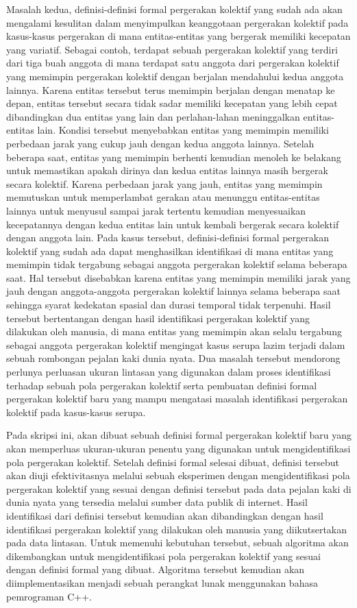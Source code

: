 Masalah kedua, definisi-definisi formal pergerakan kolektif yang sudah ada akan mengalami kesulitan dalam menyimpulkan keanggotaan pergerakan kolektif pada kasus-kasus pergerakan di mana entitas-entitas yang bergerak memiliki kecepatan yang variatif. Sebagai contoh, terdapat sebuah pergerakan kolektif yang terdiri dari tiga buah anggota di mana terdapat satu anggota dari pergerakan kolektif yang memimpin pergerakan kolektif dengan berjalan mendahului kedua anggota lainnya. Karena entitas tersebut terus memimpin berjalan dengan menatap ke depan, entitas tersebut secara tidak sadar memiliki kecepatan yang lebih cepat dibandingkan dua entitas yang lain dan perlahan-lahan meninggalkan entitas-entitas lain. Kondisi tersebut menyebabkan entitas yang memimpin memiliki perbedaan jarak yang cukup jauh dengan kedua anggota lainnya. Setelah beberapa saat, entitas yang memimpin berhenti kemudian menoleh ke belakang untuk memastikan apakah dirinya dan kedua entitas lainnya masih bergerak secara kolektif. Karena perbedaan jarak yang jauh, entitas yang memimpin memutuskan untuk memperlambat gerakan atau menunggu entitas-entitas lainnya untuk menyusul sampai jarak tertentu kemudian menyesuaikan kecepatannya dengan kedua entitas lain untuk kembali bergerak secara kolektif dengan anggota lain. Pada kasus tersebut, definisi-definisi formal pergerakan kolektif yang sudah ada dapat menghasilkan identifikasi di mana entitas yang memimpin tidak tergabung sebagai anggota pergerakan kolektif selama beberapa saat. Hal tersebut disebabkan karena entitas yang memimpin memiliki jarak yang jauh dengan anggota-anggota pergerakan kolektif lainnya selama beberapa saat sehingga syarat kedekatan spasial dan durasi temporal tidak terpenuhi. Hasil tersebut bertentangan dengan hasil identifikasi pergerakan kolektif yang dilakukan oleh manusia, di mana entitas yang memimpin akan selalu tergabung sebagai anggota pergerakan kolektif mengingat kasus serupa lazim terjadi dalam sebuah rombongan pejalan kaki dunia nyata. Dua masalah tersebut mendorong perlunya perluasan ukuran lintasan yang digunakan dalam proses identifikasi terhadap sebuah pola pergerakan kolektif serta pembuatan definisi formal pergerakan kolektif baru yang mampu mengatasi masalah identifikasi pergerakan kolektif pada kasus-kasus serupa. 

Pada skripsi ini, akan dibuat sebuah definisi formal pergerakan kolektif baru yang akan memperluas ukuran-ukuran penentu yang digunakan untuk mengidentifikasi pola pergerakan kolektif. Setelah definisi formal selesai dibuat, definisi tersebut akan diuji efektivitasnya melalui sebuah eksperimen dengan mengidentifikasi pola pergerakan kolektif yang sesuai dengan definisi tersebut pada data pejalan kaki di dunia nyata yang tersedia melalui sumber data publik di internet. Hasil identifikasi dari definisi tersebut kemudian akan dibandingkan dengan hasil identifikasi pergerakan kolektif yang dilakukan oleh manusia yang diikutsertakan pada data lintasan. Untuk memenuhi kebutuhan tersebut, sebuah algoritma akan dikembangkan untuk mengidentifikasi pola pergerakan kolektif yang sesuai dengan definisi formal yang dibuat. Algoritma tersebut kemudian akan diimplementasikan menjadi sebuah perangkat lunak menggunakan bahasa pemrograman C++.


